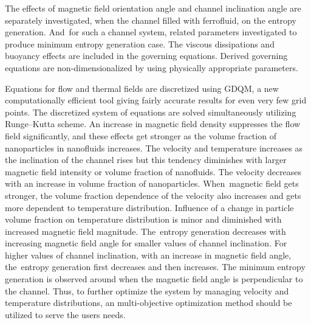 The effects of magnetic field orientation angle and channel inclination angle are separately investigated, when the channel filled with ferrofluid, on the entropy generation.  And~for such a channel system, related parameters investigated to produce minimum entropy generation case. The viscous dissipations and buoyancy effects are included in the governing equations. Derived governing equations are non-dimensionalized by using physically appropriate parameters. 

Equations for flow and thermal fields are discretized using GDQM, a new computationally efficient tool giving fairly accurate results for even very few grid points. The discretized system of equations are solved simultaneously utilizing Runge--Kutta scheme.
 An increase in magnetic field density suppresses the flow field significantly, and these effects get stronger as the volume fraction of nanoparticles in nanofluids increases. The velocity and temperature increases as the inclination of the channel rises but this tendency diminishes with larger magnetic field intensity or volume fraction of nanofluids. The velocity decreases with an increase in volume fraction of nanoparticles. When~magnetic field gets stronger, the volume fraction dependence of the velocity also increases and gets more dependent to temperature distribution. Influence of a change in particle volume fraction on temperature distribution is minor and diminished with increased magnetic field magnitude. The~entropy generation decreases with increasing magnetic field angle for smaller values of channel inclination. For higher values of channel inclination, with an increase in magnetic field angle, 
the~entropy generation first decreases and then increases. The minimum entropy generation is observed around when the magnetic field angle is perpendicular to the channel. Thus, to further optimize the system by managing velocity and temperature distributions, an multi-objective optimization method should be utilized to serve the users needs.

